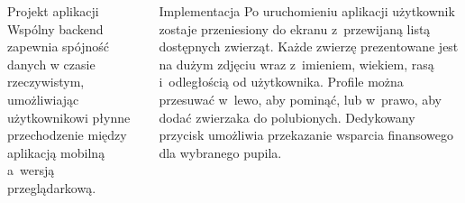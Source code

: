 \documentclass[final]{beamer} %
\begin{document}
\begin{frame}{}
\begin{columns}[T]
\begin{column}[T]{0.48\textwidth}
\begin{block}{Projekt aplikacji}
Wspólny backend zapewnia spójność danych w czasie rzeczywistym, umożliwiając użytkownikowi płynne przechodzenie między aplikacją mobilną a~wersją przeglądarkową.
\end{block}
\end{column}
\begin{column}[T]{0.48\textwidth}
\begin{block}{Implementacja}
\justifying
Po uruchomieniu aplikacji użytkownik zostaje przeniesiony do ekranu z~przewijaną listą dostępnych zwierząt. Każde zwierzę prezentowane jest na dużym zdjęciu wraz z~imieniem, wiekiem, rasą i~odległością od użytkownika. Profile można przesuwać w~lewo, aby pominąć, lub w~prawo, aby dodać zwierzaka do polubionych. Dedykowany przycisk umożliwia przekazanie wsparcia finansowego dla wybranego pupila.
\vspace{0.2cm}
\begin{figure}[h]
\centering
\begin{subfigure}{0.325\textwidth}

\end{subfigure}
\end{figure}
\end{block}
\end{column}
\end{columns}
\end{frame}
\end{document}
